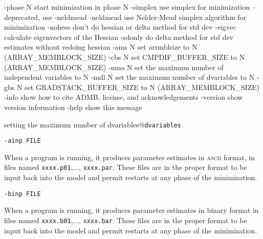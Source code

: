 \begin{code}
 -phase N        start minimization in phase N
 -simplex        use simplex for minimization -- deprecated, use -neldmead
 -neldmead       use Nelder-Mead simplex algorithm for minimization
 -nohess         don't do hessian or delta method for std dev
 -eigvec         calculate eigenvectors of the Hessian
 -sdonly         do delta method for std dev estimates without redoing hessian
 -ams N          set arrmblsize to N (ARRAY_MEMBLOCK_SIZE)
 -cbs N          set CMPDIF_BUFFER_SIZE to N (ARRAY_MEMBLOCK_SIZE)
 -mno N          set the maximum number of independent variables to N
 -mdl N          set the maximum number of dvariables to N
 -gbs N          set GRADSTACK_BUFFER_SIZE to N (ARRAY_MEMBLOCK_SIZE)
 -info           show how to cite ADMB, license, and acknowledgements
 -version        show version information
 -help           show this message
\end{code}

%
{setting the maximum number of dvariables@\texttt{dvariables}}
\begin{lstlisting}
-ainp FILE
\end{lstlisting}

When a program is running, it produces parameter estimates in \textsc{ascii}
format, in files named \texttt{xxxx.p01},$\ldots$, \texttt{xxxx.par}.
These files are in the proper format to be input back into the model
and permit restarts at any phase of the minimization.

\begin{lstlisting}
-binp FILE
\end{lstlisting}

When a program is running, it produces parameter estimates in binary
format in files named \texttt{xxxx.b01},$\ldots$, \texttt{xxxx.bar}.
These files are in the proper format to be input back into the model
and permit restarts at any phase of the minimization.

